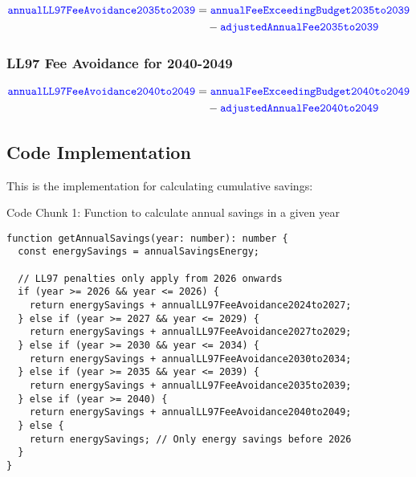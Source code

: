 \documentclass{article}
\newcommand{\code}[1]{\textcolor{blue}{\texttt{#1}}}
\begin{document}
\begin{align}
\code{annualLL97FeeAvoidance2035to2039} &= \code{annualFeeExceedingBudget2035to2039} \nonumber \\
&\quad - \code{adjustedAnnualFee2035to2039}
\end{align}

\subsubsection{LL97 Fee Avoidance for 2040-2049}

\begin{align}
\code{annualLL97FeeAvoidance2040to2049} &= \code{annualFeeExceedingBudget2040to2049} \nonumber \\
&\quad - \code{adjustedAnnualFee2040to2049}
\end{align}

\newpage
\subsection{Code Implementation}

This is the implementation for calculating cumulative savings:

\bigskip

Code Chunk 1: Function to calculate annual savings in a given year
\begin{lstlisting}
function getAnnualSavings(year: number): number {
  const energySavings = annualSavingsEnergy;
  
  // LL97 penalties only apply from 2026 onwards
  if (year >= 2026 && year <= 2026) {
    return energySavings + annualLL97FeeAvoidance2024to2027;
  } else if (year >= 2027 && year <= 2029) {
    return energySavings + annualLL97FeeAvoidance2027to2029;
  } else if (year >= 2030 && year <= 2034) {
    return energySavings + annualLL97FeeAvoidance2030to2034;
  } else if (year >= 2035 && year <= 2039) {
    return energySavings + annualLL97FeeAvoidance2035to2039;
  } else if (year >= 2040) {
    return energySavings + annualLL97FeeAvoidance2040to2049;
  } else {
    return energySavings; // Only energy savings before 2026
  }
}
\end{lstlisting}
\end{document}
